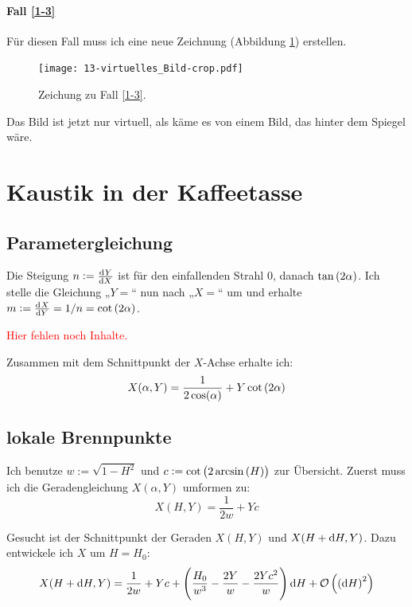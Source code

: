 \documentclass[11pt, ngerman, fleqn]{article}
\newcommand{\fehlt}{\textcolor{red}{Hier fehlen noch Inhalte.}}
\begin{document}
\paragraph{Fall \ref{1-3}}

Für diesen Fall muss ich eine neue Zeichnung (Abbildung \ref{fig:3}) erstellen.

{
	\begin{figure}
		\centering
		\texttt{[image: 13-virtuelles\_Bild-crop.pdf]}
		\caption{Zeichung zu Fall \ref{1-3}.}
		\label{fig:3}
	\end{figure}
}

Das Bild ist jetzt nur virtuell, als käme es von einem Bild, das hinter dem
Spiegel wäre.


\section{Kaustik in der Kaffeetasse}
\label{2}

\subsection{Parametergleichung}

Die Steigung $n := \od YX$ ist für den einfallenden Strahl $0$, danach
$\tan\del{2\alpha}$. Ich stelle die Gleichung „$Y=$“ nun nach „$X=$“ um und
erhalte $m := \od XY = 1/n = \cot\del{2\alpha}$.

\fehlt

Zusammen mit dem Schnittpunkt der $X$-Achse erhalte ich:
\[
	X(\alpha, Y) = \frac{1}{2 \cos(\alpha)} + Y \cot\del{2\alpha}
\]

\subsection{lokale Brennpunkte}

Ich benutze $w := \sqrt{1-H^2}$ und $c := \cot\del{2 \arcsin\del H}$ zur
Übersicht. Zuerst muss ich die Geradengleichung $X(\alpha, Y)$ umformen zu:
\[
	X(H, Y) = \frac{1}{2w} + Y c
\]

Gesucht ist der Schnittpunkt der Geraden $X(H, Y)$ und $X(H + \dif H, Y)$. Dazu
entwickele ich $X$ um $H = H_0$:
\[
	X(H + \dif H, Y) = \frac{1}{2w} + Y c + \del{\frac{H_0}{w^3} - \frac{2Y}{w} - \frac{2Y c^2}{w}} \dif H + \mathcal O\del{\del{\dif H}^2}
\]
\end{document}
